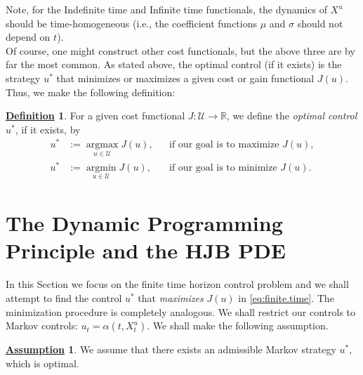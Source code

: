 \documentclass[12pt]{book}
\numberwithin{equation}{chapter}
\theoremstyle{plain}
\numberwithin{theorem}{section}
\theoremstyle{definition}
\newtheorem{definition}[theorem]{\underline{Definition}}
\newtheorem{assumption}[theorem]{\underline{Assumption}}
\numberwithin{exercise}{chapter}
\newcommand{\<}{\langle}
\renewcommand{\>}{\rangle}
\renewcommand{\(}{\left(}
\renewcommand{\)}{\right)}
\renewcommand{\[}{\left[}
\renewcommand{\]}{\right]}
\newcommand\Rb{\mathds{R}}
\newcommand\Uc{\mathscr{U}}
\newcommand\sig{\sigma}
\begin{document}
Note, for the Indefinite time and Infinite time functionals, the dynamics of $X^u$ should be time-homogeneous (i.e., the coefficient functions $\mu$ and $\sig$ should not depend on $t$).
\\[0.5em]
Of course, one might construct other cost functionals, but the above three are by far the most common.  As stated above, the optimal control (if it exists) is the strategy $u^*$ that minimizes or maximizes a given cost or gain functional $J(u)$.  Thus, we make the following definition:

\begin{definition}
For a given cost functional $J : \Uc \to \Rb$, we define the \emph{optimal control} $u^*$, if it exists, by 
\begin{align}
u^*
	&:=	\operatorname*{argmax}_{u \in \Uc} J(u) , &
	&\text{if our goal is to maximize $J(u)$}, \\
u^*
	&:=	\operatorname*{argmin}_{u \in \Uc} J(u) , &
	&\text{if our goal is to minimize $J(u)$}.
\end{align}
\end{definition}

\section{The Dynamic Programming Principle and the HJB PDE}
In this Section we focus on the finite time horizon control problem and we shall attempt to find the control $u^*$ that \emph{maximizes} $J(u)$ in \eqref{eq:finite.time}.  The minimization procedure is completely analogous.  We shall restrict our controls to Markov controls: $u_t = \alpha(t,X_t^u)$.  
We shall make the following assumption.

\begin{assumption}
\label{ass:markov}
We assume that there exists an admissible Markov strategy $u^*$, which is optimal.
\end{assumption}
\end{document}
